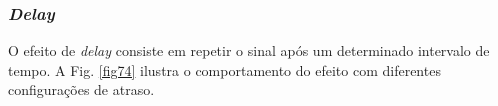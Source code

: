 

\subsubsection*{\textit{Delay}}

O efeito de \textit{delay} consiste em repetir o sinal após um determinado intervalo de tempo. A Fig. \ref{fig74} ilustra o comportamento do efeito com diferentes configurações de atraso.

